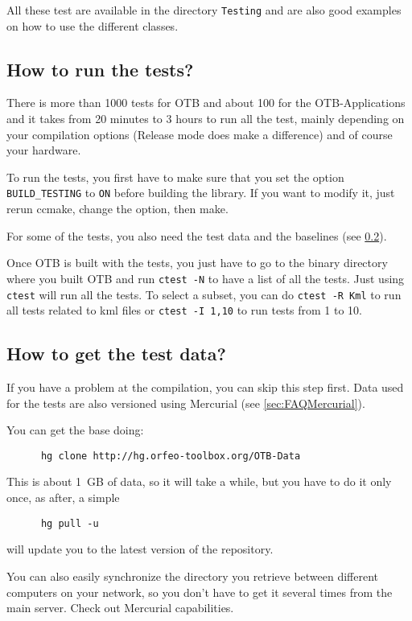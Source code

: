 All these test are available in the directory \texttt{Testing} and are also good examples on how to use the different classes.

\subsection{How to run the tests?}

There is more than 1000 tests for OTB and about 100 for the OTB-Applications and it takes from 20 minutes to 3 hours to run all the test, mainly depending on your compilation options (Release mode does make a difference) and of course your hardware.

To run the tests, you first have to make sure that you set the option \texttt{BUILD\_TESTING} to \texttt{ON} before building the library. If you want to modify it, just rerun ccmake, change the option, then make.

For some of the tests, you also need the test data and the baselines (see \ref{sec:FAQTestData}).

Once OTB is built with the tests, you just have to go to the binary directory where you built OTB and run \texttt{ctest -N} to have a list of all the tests. Just using \texttt{ctest} will run all the tests. To select a subset, you can do \texttt{ctest -R Kml} to run all tests related to kml files or \texttt{ctest -I 1,10} to run tests from 1 to 10.

\subsection{How to get the test data?}\label{sec:FAQTestData}

If you have a problem at the compilation, you can skip this step first.
Data used for the tests are also versioned using Mercurial (see \ref{sec:FAQMercurial}).

You can get the base doing:
\begin{verbatim}
      hg clone http://hg.orfeo-toolbox.org/OTB-Data
\end{verbatim}

This is about 1~GB of data, so it will take a while, but you have to do it only once, as after, a simple
\begin{verbatim}
      hg pull -u
\end{verbatim}
will update you to the latest version of the repository.

You can also easily synchronize the directory you retrieve between different computers on your network, so you don't have to get it several times from the main server. Check out Mercurial capabilities.

